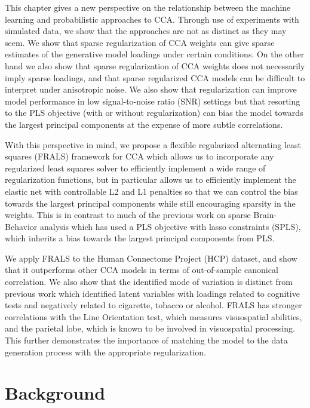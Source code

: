 This chapter gives a new perspective on the relationship between the machine learning and probabilistic approaches to CCA. Through use of experiments with simulated data, we show that the approaches are not as distinct as they may seem.
We show that sparse regularization of CCA weights can give sparse estimates of the generative model loadings under certain conditions.
On the other hand we also show that sparse regularization of CCA weights does not necessarily imply sparse loadings, and that sparse regularized CCA models can be difficult to interpret under anisotropic noise.
We also show that regularization can improve model performance in low signal-to-noise ratio (SNR) settings but that resorting to the PLS objective (with or without regularization) can bias the model towards the largest principal components at the expense of more subtle correlations.

With this perspective in mind, we propose a flexible regularized alternating least squares (FRALS) framework for CCA which allows us to incorporate any regularized least squares solver to efficiently implement a wide range of regularization functions, but in particular allows us to efficiently implement the elastic net with controllable L2 and L1 penalties so that we can control the bias towards the largest principal components while still encouraging sparsity in the weights.
This is in contrast to much of the previous work on sparse Brain-Behavior analysis which has used a PLS objective with lasso constraints (SPLS), which inherits a bias towards the largest principal components from PLS.

We apply FRALS to the Human Connectome Project (HCP) dataset, and show that it outperforms other CCA models in terms of out-of-sample canonical correlation.
We also show that the identified mode of variation is distinct from previous work which identified latent variables with loadings related to cognitive tests and negatively related to cigarette, tobacco or alcohol\cite{smith2015positive}.
FRALS has stronger correlations with the Line Orientation test, which measures visuospatial abilities, and the parietal lobe, which is known to be involved in visuospatial processing.
This further demonstrates the importance of matching the model to the data generation process with the appropriate regularization.

\section{Background}\label{sec:background}


